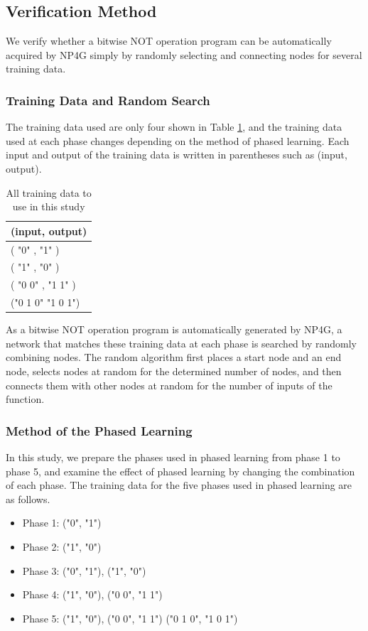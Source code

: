 \documentclass{article}
\begin{document}
\subsection {Verification Method}
We verify whether a bitwise NOT operation program can be automatically acquired by NP4G simply by randomly selecting and connecting nodes for several training data.

\subsubsection {Training Data and Random Search}
The training data used are only four shown in Table \ref{tbl:TeacherData}, and the training data used at each phase changes depending on the method of phased learning.
Each input and output of the training data is written in parentheses such as (input, output).

\begin{table}[htbp]
\centering
\caption {All training data to use in this study}
\label{tbl:TeacherData}
\begin{tabular}{l}
\hline
(input, output) \\
\hline \hline
( "0" , "1" ) \\
( "1" , "0" ) \\
( "0 0" , "1 1" ) \\
("0 1 0" "1 0 1") \\
\hline
\end{tabular}
\end{table}

As a bitwise NOT operation program is automatically generated by NP4G, a network that matches these training data at each phase is searched by randomly combining nodes.
The random algorithm first places a start node and an end node, selects nodes at random for the determined number of nodes, and then connects them with other nodes at random for the number of inputs of the function.

\subsubsection {Method of the Phased Learning}
\label{sec:PLhow}
In this study, we prepare the phases used in phased learning from phase 1 to phase 5, and examine the effect of phased learning by changing the combination of each phase.
The training data for the five phases used in phased learning are as follows.

\begin{itemize}
\item Phase 1: ("0", "1")
\item Phase 2: ("1", "0")
\item Phase 3: ("0", "1"), ("1", "0")
\item Phase 4: ("1", "0"), ("0 0", "1 1")
\item Phase 5: ("1", "0"), ("0 0", "1 1") ("0 1 0", "1 0 1")
\end{itemize}
\end{document}
